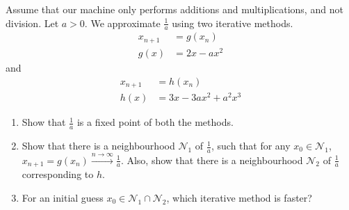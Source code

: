 \documentclass[fleqn, a4paper, 11pt, oneside]{amsart}
\theoremstyle{definition}
\theoremstyle{theorem}
\begin{document}
\begin{question}
	Assume that our machine only performs additions and multiplications, and not division.
	Let $a > 0$.
	We approximate $\frac{1}{a}$ using two iterative methods.
	\begin{align*}
		x_{n + 1} & = g(x_n) \\
		g(x)      & = 2 x - a x^2
	\end{align*}
	and
	\begin{align*}
		x_{n + 1} & = h(x_n) \\
		h(x)      & = 3 x - 3 a x^2 + a^2 x^3
	\end{align*}
	\begin{enumerate}
		\item
			Show that $\frac{1}{a}$ is a fixed point of both the methods.
		\item
			Show that there is a neighbourhood $\mathcal{N}_1$ of $\frac{1}{a}$, such that for any $x_0 \in \mathcal{N}_1$, $x_{n + 1} = g(x_n) \xrightarrow{n \to \infty} \frac{1}{a}$.
			Also, show that there is a neighbourhood $\mathcal{N}_2$ of $\frac{1}{a}$ corresponding to $h$.
		\item
			For an initial guess $x_0 \in \mathcal{N}_1 \cap \mathcal{N}_2$, which iterative method is faster?
	\end{enumerate}
\end{question}
\end{document}
